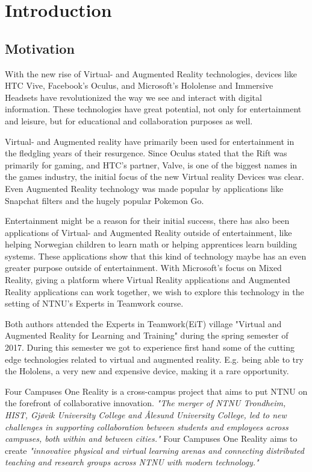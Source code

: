 \chapter{Introduction}
  
    \section{Motivation}
        With the new rise of Virtual- and Augmented Reality technologies, devices like HTC Vive, Facebook's Oculus, and Microsoft's Hololense and Immersive Headsets have revolutionized the way we see and interact with digital information. These technologies have great potential, not only for entertainment and leisure, but for educational and collaboration purposes as well.
    
        Virtual- and Augmented reality have primarily been used for entertainment in the fledgling years of their resurgence. Since Oculus stated that the Rift was primarily for gaming\cite{OculusMarkZuckerberg}, and HTC's partner, Valve, is one of the biggest names in the games industry\cite{ValveBigName}, the initial focus of the new Virtual reality Devices was clear. Even Augmented Reality technology was made popular by applications like Snapchat\cite{Snapchat} filters and the hugely popular Pokemon Go\cite{PokemonGo}.
        
        Entertainment might be a reason for their initial success, there has also been applications of Virtual- and Augmented Reality outside of entertainment, like helping Norwegian children to learn math\cite{innomag2017} or helping apprentices learn building systems\cite{Nordbohus2017}. These applications show that this kind of technology maybe has an even greater purpose outside of entertainment. With Microsoft's focus on Mixed Reality, giving a platform where Virtual Reality applications and Augmented Reality applications can work together, we wish to explore this technology in the setting of NTNU's Experts in Teamwork
        course.
        
        Both authors attended the Experts in Teamwork(EiT) village "Virtual and Augmented Reality for Learning and Training" during the spring semester of 2017. During this semester we got to experience first hand some of the cutting edge technologies related to virtual and augmented reality. E.g. being able to try the Hololens, a very new and expensive device, making it a rare opportunity.
        
        Four Campuses One Reality is a cross-campus project that aims to put NTNU on the forefront of collaborative innovation. \emph{"The merger of NTNU Trondheim, HIST, Gjøvik University College and Ålesund University College, led to new challenges in supporting collaboration between students and employees across campuses, both within and between cities."} \cite{4C1R-Pitch} Four Campuses One Reality aims to create \emph{"innovative physical and virtual learning arenas and connecting distributed teaching and research groups across NTNU with modern technology."} \cite{4C1R-Pitch} 
                
